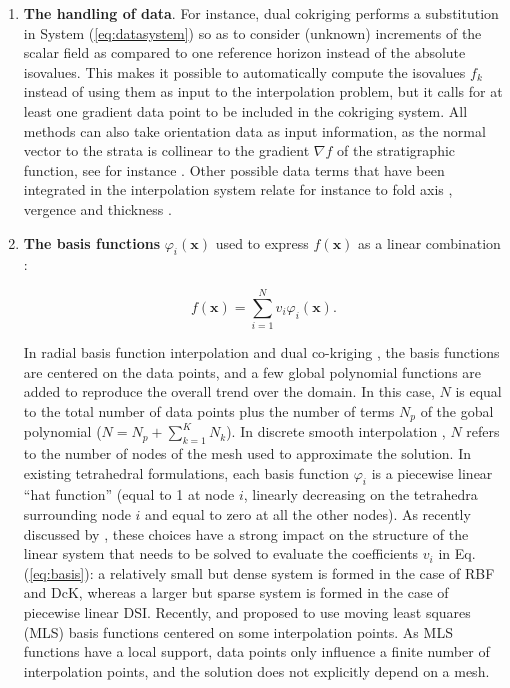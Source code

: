 \documentclass[final]{ring20}
\begin{document}
\begin{enumerate}
\item \textbf{The handling of data}. For instance, dual cokriging \citep[DcK, ][]{Lajaunie1997MG,Chiles04OMSMP,Calcagno2008PEPI} performs a substitution in System (\ref{eq:datasystem}) so as to consider (unknown) increments of the scalar field as compared to one reference horizon instead of the absolute isovalues. This makes it possible to automatically compute the isovalues $f_k$ instead of using them as input to the interpolation problem, but it calls for at least one gradient data point to be included in the cokriging system. All methods can also take orientation data as input information, as the normal vector to the strata is collinear to the gradient $\nabla f$ of the stratigraphic function, see for instance \citet{Frank2007CG,Hillier2014MG}. Other possible data terms that have been integrated in the interpolation system relate for instance to fold axis \citep{MassiotGM2010,Hillier2014MG}, vergence \citep{Laurent2016EaPSL,Grose2017JSG} and thickness \citep{Laurent2016MG}.

\item \textbf{The basis functions} $\varphi_i(\mathbf{x})$ used to express $f(\mathbf{x})$ as a linear combination \citep[e.g., ][]{Renaudeau2019MG,Wellmann2018AiG}: 

\begin{equation}
\label{eq:basis}
  f(\mathbf{x}) = \sum_{i=1}^{N}{v_i\varphi_i(\mathbf{x})}.
\end{equation}

In radial basis function interpolation \citep[RBF, ][]{Cowan2002ASGMEM,Hillier2014MG} and dual co-kriging \citep[][]{Lajaunie1997MG,Calcagno2008PEPI}, the basis functions are centered on the data points, and a few global polynomial functions are added to reproduce the overall trend over the domain. In this case, $N$ is equal to the total number of data points plus the number of terms $N_p$ of the gobal polynomial ($N = N_p + \sum_{k=1}^{K}{N_k}$). In discrete smooth interpolation \citep[DSI, ][]{Frank2007CG,Caumon2013GaRSITo,Souche20137ECEISE2,Laurent2016MG,Irakarama2018EAGE}, $N$ refers to the number of nodes of the mesh used to approximate the solution. In existing tetrahedral formulations, each basis function $\varphi_i$ is a piecewise linear ``hat function'' (equal to 1 at node $i$, linearly decreasing on the tetrahedra surrounding node $i$ and equal to zero at all the other nodes). As recently discussed by \citet{Renaudeau2019MG}, these choices have a strong impact on the structure of the linear system that needs to be solved to evaluate the coefficients $v_i$ in Eq. (\ref{eq:basis}): a relatively small but dense system is formed in the case of RBF and DcK, whereas a larger but sparse system is formed in the case of piecewise linear DSI. Recently, \citet{Renaudeau2019MG} and \citet{Manchuk2019CG} proposed to use moving least squares (MLS) basis functions centered on some interpolation points. As MLS functions have a local support, data points only influence a finite number of interpolation points, and the solution does not explicitly depend on a mesh.


\end{enumerate}
\end{document}
